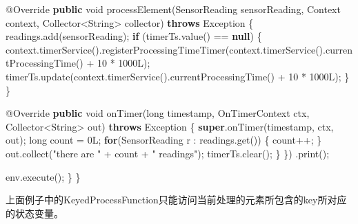 \documentclass[cn,11pt,chinese]{elegantbook}
\newenvironment{Shaded}{}{}
\newcommand{\AttributeTok}[1]{\textcolor[rgb]{0.49,0.56,0.16}{#1}}
\newcommand{\BuiltInTok}[1]{#1}
\newcommand{\DataTypeTok}[1]{\textcolor[rgb]{0.56,0.13,0.00}{#1}}
\newcommand{\DecValTok}[1]{\textcolor[rgb]{0.25,0.63,0.44}{#1}}
\newcommand{\FunctionTok}[1]{\textcolor[rgb]{0.02,0.16,0.49}{#1}}
\newcommand{\KeywordTok}[1]{\textcolor[rgb]{0.00,0.44,0.13}{\textbf{#1}}}
\newcommand{\NormalTok}[1]{#1}
\newcommand{\StringTok}[1]{\textcolor[rgb]{0.25,0.44,0.63}{#1}}
\begin{document}
\begin{Shaded}
\begin{Highlighting}[]
                \AttributeTok{@Override}
                \KeywordTok{public} \DataTypeTok{void} \FunctionTok{processElement}\NormalTok{(SensorReading sensorReading, }\BuiltInTok{Context}\NormalTok{ context, Collector\textless{}}\BuiltInTok{String}\NormalTok{\textgreater{} collector) }\KeywordTok{throws} \BuiltInTok{Exception}\NormalTok{ \{}
\NormalTok{                    readings.}\FunctionTok{add}\NormalTok{(sensorReading);}
                    \KeywordTok{if}\NormalTok{ (timerTs.}\FunctionTok{value}\NormalTok{() == }\KeywordTok{null}\NormalTok{) \{}
\NormalTok{                        context.}\FunctionTok{timerService}\NormalTok{().}\FunctionTok{registerProcessingTimeTimer}\NormalTok{(context.}\FunctionTok{timerService}\NormalTok{().}\FunctionTok{currentProcessingTime}\NormalTok{() + }\DecValTok{10}\NormalTok{ * }\DecValTok{1000L}\NormalTok{);}
\NormalTok{                        timerTs.}\FunctionTok{update}\NormalTok{(context.}\FunctionTok{timerService}\NormalTok{().}\FunctionTok{currentProcessingTime}\NormalTok{() + }\DecValTok{10}\NormalTok{ * }\DecValTok{1000L}\NormalTok{);}
\NormalTok{                    \}}
\NormalTok{                \}}

                \AttributeTok{@Override}
                \KeywordTok{public} \DataTypeTok{void} \FunctionTok{onTimer}\NormalTok{(}\DataTypeTok{long}\NormalTok{ timestamp, OnTimerContext ctx, Collector\textless{}}\BuiltInTok{String}\NormalTok{\textgreater{} out) }\KeywordTok{throws} \BuiltInTok{Exception}\NormalTok{ \{}
                    \KeywordTok{super}\NormalTok{.}\FunctionTok{onTimer}\NormalTok{(timestamp, ctx, out);}
                    \DataTypeTok{long}\NormalTok{ count = }\DecValTok{0L}\NormalTok{;}
                    \KeywordTok{for}\NormalTok{(SensorReading r : readings.}\FunctionTok{get}\NormalTok{()) \{}
\NormalTok{                        count++;}
\NormalTok{                    \}}
\NormalTok{                    out.}\FunctionTok{collect}\NormalTok{(}\StringTok{"there are "}\NormalTok{ + count + }\StringTok{" readings"}\NormalTok{);}
\NormalTok{                    timerTs.}\FunctionTok{clear}\NormalTok{();}
\NormalTok{                \}}
\NormalTok{            \})}
\NormalTok{            .}\FunctionTok{print}\NormalTok{();}

\NormalTok{        env.}\FunctionTok{execute}\NormalTok{();}
\NormalTok{    \}}
\NormalTok{\}}
\end{Highlighting}
\end{Shaded}

上面例子中的KeyedProcessFunction只能访问当前处理的元素所包含的key所对应的状态变量。
\end{document}
